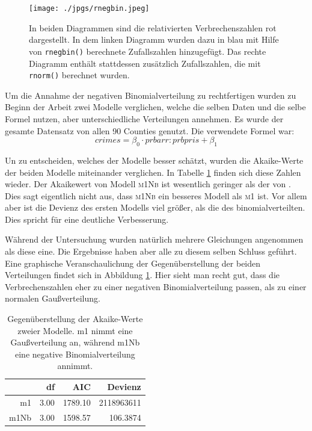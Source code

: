 \begin{figure}
\centering
\texttt{[image: ./jpgs/rnegbin.jpeg]}
\caption{In beiden Diagrammen sind die relativierten Verbrechenszahlen rot dargestellt.
		 In dem linken Diagramm wurden dazu in blau mit Hilfe von \texttt{rnegbin()} berechnete     Zufallszahlen hinzugef\"ugt.
		 Das rechte Diagramm enth\"alt stattdessen zus\"atzlich Zufallszahlen, die mit \texttt{rnorm()} berechnet wurden.}
\label{fig:nbd}
\end{figure}
\par\smallskip

Um die Annahme der negativen Binomialverteilung zu rechtfertigen wurden zu Beginn der Arbeit zwei Modelle verglichen, welche die selben Daten und die selbe Formel nutzen, aber unterschiedliche Verteilungen annehmen.
Es wurde der gesamte Datensatz von allen 90 Counties genutzt.
Die verwendete Formel war:
\begin{equation}
crimes = \beta_0 \cdot prbarr:prbpris + \beta_1
\end{equation}

Un zu entscheiden, welches der Modelle besser sch\"atzt, wurden die Akaike-Werte der beiden Modelle miteinander verglichen.
In Tabelle \ref{tab:agn} finden sich diese Zahlen wieder.
Der Akaikewert von Modell \textsc{m1Nb} ist wesentlich geringer als der von .
Dies sagt eigentlich nicht aus, dass \textsc{m1Nb} ein besseres Modell als \textsc{m1} ist.
Vor allem aber ist die Devienz des ersten Modells viel gr\"o\ss{}er, als die des binomialverteilten.
Dies spricht f\"ur eine deutliche Verbesserung.
\par\smallskip
W\"ahrend der Untersuchung wurden nat\"urlich mehrere Gleichungen angenommen als diese eine.
Die Ergebnisse haben aber alle zu diesem selben Schluss gef\"uhrt.
Eine graphische Veranschaulichung der Gegen\"uberstellung der beiden Verteilungen findet sich in Abbildung \ref{fig:nbd}.
Hier sieht man recht gut, dass die Verbrechenszahlen eher zu einer negativen Binomialverteilung passen, als zu einer normalen Gau\ss{}verteilung.
  
\begin{table}[ht]
\centering
\begin{tabular}{rrrr}
  \hline
 	   & df & AIC & Devienz\\ 
  \hline
	m1 & 3.00 & 1789.10 & 2118963611\\ 
  m1Nb & 3.00 & 1598.57 & 106.3874\\ 
   \hline
\end{tabular}
\caption{Gegen\"uberstellung der Akaike-Werte zweier Modelle. m1 nimmt eine Gau\ss{}verteilung an, w\"ahrend m1Nb eine negative Binomialverteilung annimmt.}
\label{tab:agn}
\end{table}


